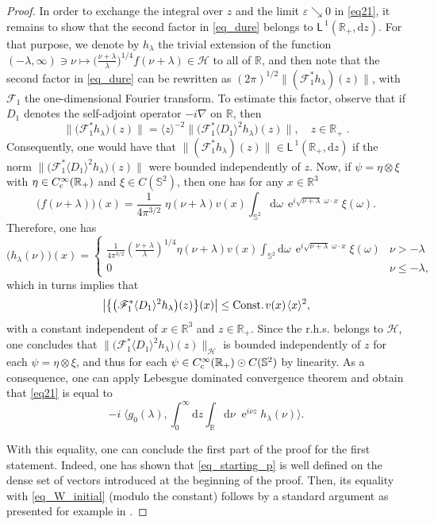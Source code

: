 \documentclass{article}
\def\d{\mathrm{d}}
\def\F{\mathscr F}
\def\H{\mathcal H}
\def\R{\mathbb R}
\def\S{\mathbb S}
\def\lone{\mathsf{L}^{\:\!\!1}}
\def\e{\mathop{\mathrm{e}}\nolimits}
\begin{document}
\begin{proof}
In order to exchange the integral over $z$ and the limit $\varepsilon\searrow0$ in
\eqref{eq21}, it remains to show that the second factor in \eqref{eq_dure} belongs to
$\lone(\R_+,\d z)$. For that purpose, we denote by $h_\lambda$ the trivial extension
of the function
$
(-\lambda,\infty)\ni\nu\mapsto
\big(\frac{\nu+\lambda}{\lambda}\big)^{1/4}f(\nu+\lambda)\in\H
$
to all of $\R$, and then note that the second factor in \eqref{eq_dure} can be rewritten
as $(2\pi)^{1/2}\|(\F_1^*h_\lambda)(z)\|$, with $\F_1$ the one-dimensional
Fourier transform. To estimate this factor, observe that if $D_1$ denotes the
self-adjoint operator $-i\nabla$ on $\R$, then
$$
\big\|\big(\F_1^*h_\lambda\big)(z)\big\|
=\langle z\rangle^{-2}
\big\|\big(\F_1^*\langle D_1\rangle^2h_\lambda\big)(z)\big\|,
\quad z\in\R_+\;\!.
$$
Consequently, one would have that
$
\|(\F_1^*h_\lambda)(z)\|\in\lone(\R_+,\d z)
$
if the norm
$
\big\|\big(\F_1^*\langle D_1\rangle^2h_\lambda\big)(z)\big\|
$
were bounded independently of $z$. Now, if $\psi=\eta\otimes\xi$ with
$\eta\in C_{\rm c}^\infty(\R_+)$ and $\xi\in C(\S^2)$, then one has for any
$x\in\R^3$
$$
\big(f(\nu+\lambda)\big)(x)
=\frac1{4\pi^{3/2}}\;\!\eta(\nu+\lambda)v(x)\int_{\S^2}\d\omega\,
\e^{i\sqrt{\nu+\lambda}\;\!\omega\cdot x}\xi(\omega).
$$
Therefore, one has
\begin{equation*}
\big(h_\lambda(\nu)\big)(x)=
\begin{cases}
\frac1{4\pi^{3/2}}\left(\frac{\nu+\lambda}{\lambda}\right)^{1/4}\eta(\nu+\lambda) v(x)
\int_{\S^2}\d\omega\,\e^{i\sqrt{\nu+\lambda}\;\!\omega\cdot x}\xi(\omega)
& \nu>-\lambda\\
0 & \nu\le-\lambda,
\end{cases}
\end{equation*}
which in turns implies that
$$
\big|\big\{\big(\F_1^*\langle D_1\rangle^2h_\lambda\big)(z)\big\}(x)\big|
\le{\rm Const.}\;\!v(x)\;\!\langle x\rangle^2,
$$
with a constant independent of $x\in\R^3$ and $z\in\R_+$. Since the r.h.s. belongs to
$\H$, one concludes that
$\big\|\big(\F_1^*\langle D_1\rangle^2h_\lambda\big)(z)\big\|_{\H}$ is bounded
independently of $z$ for each $\psi=\eta\otimes\xi$, and thus for each
$\psi\in C^\infty_{\rm c}(\R_+)\odot C(\S^2)$ by linearity. As a consequence, one can
apply Lebesgue dominated convergence theorem and obtain that \eqref{eq21} is equal to
$$
-i\;\!\bigg\langle g_0(\lambda),\int_0^\infty\d z\int_\R\d\nu\;\!
\e^{i\nu z}h_\lambda(\nu)\bigg\rangle.
$$

With this equality, one can conclude the first part of the proof for the first statement.
Indeed, one has
shown that \eqref{eq_starting_p} is well defined on the dense set of vectors introduced at the
beginning of the proof. Then, its equality with \eqref{eq_W_initial} (modulo the constant)
follows by a standard argument as presented for example in \cite[Lem.~5.2.2]{Yaf92}. 


\end{proof}
\end{document}
